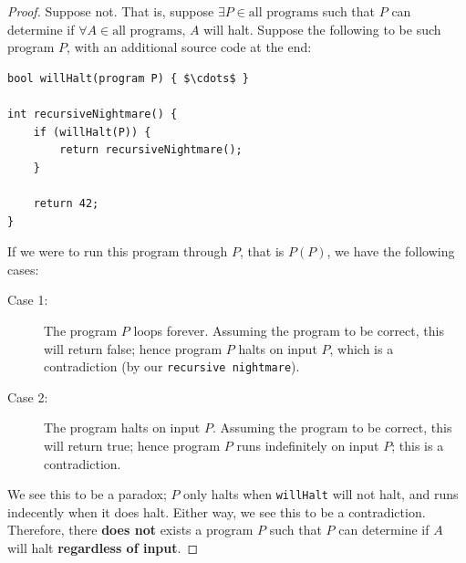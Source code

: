 \documentclass[12pt]{article}
\begin{document}
\begin{proof}
Suppose not. That is, suppose $\exists P \in \text{all programs}$ such that $P$ can determine if $\forall A \in \text{all programs}$, $A$ will halt. Suppose the following to be such program $P$, with an additional source code at the end:

\begin{lstlisting}[mathescape]
bool willHalt(program P) { $\cdots$ }

int recursiveNightmare() {
    if (willHalt(P)) {
        return recursiveNightmare();
    }

    return 42;
}

\end{lstlisting}

If we were to run this program through $P$, that is $P(P)$, we have the following cases:

\begin{description}
    \item [Case 1:] The program $P$ loops forever. Assuming the program to be correct, this will return false; hence program $P$ halts on input $P$, which is a contradiction (by our \texttt{recursive nightmare}).
    \item [Case 2:] The program halts on input $P$. Assuming the program to be correct, this will return true; hence program $P$ runs indefinitely on input $P$; this is a contradiction.
\end{description}

We see this to be a paradox; $P$ only halts when \texttt{willHalt} will not halt, and runs indecently when it does halt. Either way, we see this to be a contradiction. Therefore, there \textbf{does not} exists a program $P$ such that $P$ can determine if $A$ will halt \textbf{regardless of input}.

\end{proof}
\end{document}
